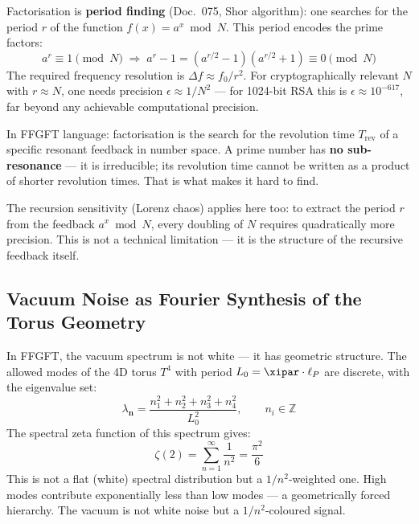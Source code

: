 \begin{technical}
Factorisation is \textbf{period finding} (Doc.~075, Shor algorithm): one searches
for the period $r$ of the function $f(x) = a^x \bmod N$. This period encodes
the prime factors:
\begin{equation}
    a^r \equiv 1 \pmod{N}
    \;\Rightarrow\;
    a^r - 1 = (a^{r/2}-1)(a^{r/2}+1) \equiv 0 \pmod{N}
\end{equation}
The required frequency resolution is $\Delta f \approx f_0/r^2$. For
cryptographically relevant $N$ with $r \approx N$, one needs precision
$\epsilon \approx 1/N^2$ — for 1024-bit RSA this is $\epsilon \approx 10^{-617}$,
far beyond any achievable computational precision.

In FFGFT language: factorisation is the search for the revolution time $T_\text{rev}$
of a specific resonant feedback in number space. A prime number has
\textbf{no sub-resonance} — it is irreducible; its revolution time cannot be
written as a product of shorter revolution times. That is what makes it hard to find.

The recursion sensitivity (Lorenz chaos) applies here too: to extract the period
$r$ from the feedback $a^x \bmod N$, every doubling of $N$ requires quadratically
more precision. This is not a technical limitation — it is the structure of the
recursive feedback itself.
\end{technical}


\subsection{Vacuum Noise as Fourier Synthesis of the Torus Geometry}

In FFGFT, the vacuum spectrum is not white — it has geometric structure.
The allowed modes of the 4D torus $T^4$ with period $L_0 = \xipar \cdot \ell_P$
are discrete, with the eigenvalue set:
\begin{equation}
    \lambda_\mathbf{n} = \frac{n_1^2 + n_2^2 + n_3^2 + n_4^2}{L_0^2},
    \qquad n_i \in \mathbb{Z}
\end{equation}
The spectral zeta function of this spectrum gives:
\begin{equation}
    \zeta(2) = \sum_{n=1}^{\infty} \frac{1}{n^2} = \frac{\pi^2}{6}
\end{equation}
This is not a flat (white) spectral distribution but a $1/n^2$-weighted one.
High modes contribute exponentially less than low modes — a geometrically forced
hierarchy. The vacuum is not white noise but a $1/n^2$-coloured signal.

